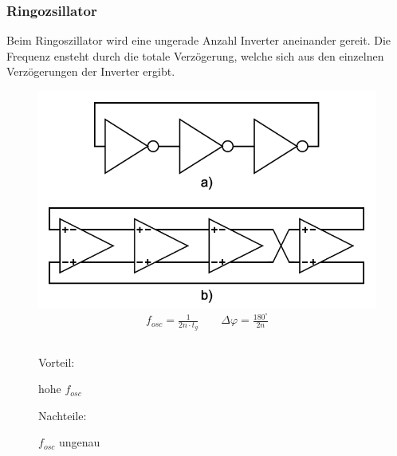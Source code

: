 \FloatBarrier
\subsubsection{Ringozsillator}
Beim Ringoszillator wird eine ungerade Anzahl Inverter aneinander gereit. Die Frequenz ensteht durch die totale Verzögerung, welche sich aus den einzelnen Verzögerungen der Inverter ergibt.
\begin{figure}[h!]
	\begin{minipage}{0.4\textwidth} 
	\includegraphics[width=1\textwidth]{images/Ring_Osc}
	\begin{equation*} 
        \begin{split} 
          f_{osc} =\frac{1}{2n\cdot t_g} \quad \quad \Delta\varphi =\frac{180^\circ}{2n}   \\\\
        \end{split} 
      \end{equation*}
	\end{minipage}
	\begin{minipage}{0.5\textwidth}
	  \begin{compactitem}
        \item Vorteil:
        \begin{compactitem}
           \item hohe $f_{osc}$ 
        \end{compactitem}
        \item Nachteile:
        \begin{compactitem}
           \item $f_{osc}$ ungenau

\end{compactitem}
\end{compactitem}
\end{minipage}
\end{figure}
